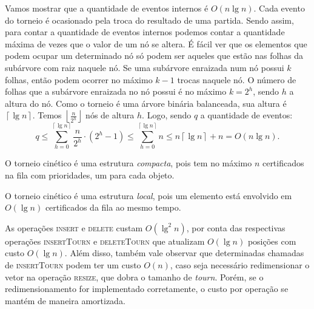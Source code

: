 Vamos mostrar que a quantidade de eventos internos é $O(n\lg{n})$.
Cada evento do torneio é ocasionado pela troca do resultado de uma partida.
Sendo assim, para contar a quantidade de eventos internos podemos contar a quantidade máxima de
vezes que o valor de um nó se altera.
É fácil ver que os elementos que podem ocupar um determinado nó só podem ser aqueles que estão nas
folhas da subárvore com raiz naquele nó.
Se uma subárvore enraizada num nó possui $k$ folhas, então podem ocorrer no máximo $k-1$ trocas
naquele nó.
O número de folhas que a subárvore enraizada no nó possui é no máximo $k = 2^h$, sendo $h$ a
altura do nó.
Como o torneio é uma árvore binária balanceada, sua altura é $\left\lceil \lg{n}\right\rceil$.
Temos $\left\lfloor \frac{n}{2^h}\right\rfloor$ nós de altura $h$.
Logo, sendo $q$ a quantidade de eventos:
$$q \leq \displaystyle\sum_{h = 0}^{\left\lceil \lg{n}\right\rceil} \dfrac{n}{2^h}\cdot (2^h -
1) \leq \displaystyle\sum_{h = 0}^{\left\lceil \lg{n}\right\rceil} n \leq n\left\lceil
\lg{n}\right\rceil + n = O(n \lg{n}).\nonumber$$

O torneio cinético é uma estrutura \textit{compacta}, pois tem no máximo $n$
certificados na fila com prioridades, um para cada objeto.

O torneio cinético é uma estrutura \textit{local}, pois um elemento está envolvido
em $O(\lg{n})$ certificados da fila ao mesmo tempo.

As operações \textsc{insert} e \textsc{delete} custam $O(\lg^2{n})$, por conta das
respectivas operações \textsc{insertTourn} e \textsc{deleteTourn} que atualizam
$O(\lg{n})$ posições com custo $O(\lg{n})$.
Além disso, também vale observar que determinadas chamadas de \textsc{insertTourn} podem ter um
custo $O(n)$, caso seja necessário redimensionar o vetor na operação \textsc{resize}, que dobra o
tamanho de \textit{tourn}.
Porém, se o redimensionamento for implementado corretamente, o custo por operação se mantém de
maneira amortizada.


